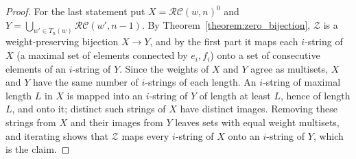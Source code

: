 \documentclass{amsart}
\theoremstyle{definition}
\theoremstyle{remark}
\numberwithin{equation}{subsection}
\newcommand{\zeromap}{\mathcal{Z}}
\newcommand{\RC}{\mathcal{RC}}
\begin{document}
\begin{proof}
For the last statement put $X=\RC(w,n)^0$ and $Y=\bigcup_{w'\in T_n(w)}\RC(w',n-1)$. By Theorem~\ref{theorem:zero_bijection}, $\zeromap$ is a weight-preserving bijection $X\to Y$, and by the first part it maps each $i$-string of $X$ (a maximal set of elements connected by $e_i,f_i$) onto a set of consecutive elements of an $i$-string of $Y$. Since the weights of $X$ and $Y$ agree as multisets, $X$ and $Y$ have the same number of $i$-strings of each length. An $i$-string of maximal length $L$ in $X$ is mapped into an $i$-string of $Y$ of length at least $L$, hence of length $L$, and onto it; distinct such strings of $X$ have distinct images. Removing these strings from $X$ and their images from $Y$ leaves sets with equal weight multisets, and iterating shows that $\zeromap$ maps every $i$-string of $X$ onto an $i$-string of $Y$, which is the claim.
\end{proof}
\end{document}
